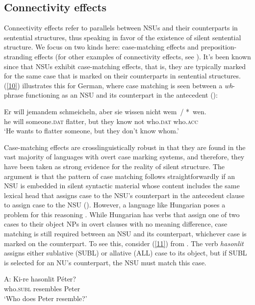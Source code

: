 {\subsection{Connectivity effects}
\label{sec-connectivity-effects}

Connectivity effects refer to parallels between NSUs and their counterparts in sentential structures, thus speaking in favor of the existence of silent sentential structure. We focus on two kinds here: case-matching effects and preposition-stranding effects (for other examples of connectivity effects, see \citealt{Ginzburg2018}). It's been known since \citet{Ross1967} that NSUs exhibit case-matching effects, that is, they are typically marked for the same case that is marked on their counterparts in sentential structures. (\ref{10}) illustrates this for German, where case matching is seen between a \emph{wh}-phrase functioning as an NSU and its counterpart in the antecedent (\citealt[663]{Merchant2005-proc}):

\ea
\gll Er will jemandem schmeicheln, aber sie wissen nicht wem~/ *~wen.\\
     he will someone.\textsc{dat} flatter, but they know not who.\textsc{dat}  who.\textsc{acc}\\
\glt `He wants to flatter someone, but they don't know whom.'\label{10}\z


Case-matching effects are crosslinguistically robust in that they are found in the vast majority of languages with overt case marking systems, and therefore, they have been taken as strong evidence for the reality of silent structure. The argument is that the pattern of case matching follows straightforwardly if an NSU is embedded in silent syntactic material whose content includes the same lexical head that assigns case to the NSU's counterpart in the antecedent clause to assign case to the NSU (\citealt{Merchant2001, Merchant2005a}). However, a language like Hungarian poses a problem for this reasoning \citep{Jacobson2016}. While Hungarian has verbs that assign one of two cases to their object NPs in overt clauses with no meaning difference, case matching is still required between an NSU and its counterpart, whichever case is marked on the counterpart. To see this, consider (\ref{11}) from \citet[356]{Jacobson2016}. The verb \emph{hasonlit} assigns either sublative (SUBL) or allative (ALL) case to its object, but if SUBL is selected for an NU's counterpart, the NSU  must match this case.

\ea
A: \gll Ki-re hasonlit P\'{e}ter?\\
        who.\textsc{subl} resembles Peter\\
   \glt  `Who does Peter resemble?'\\

}
